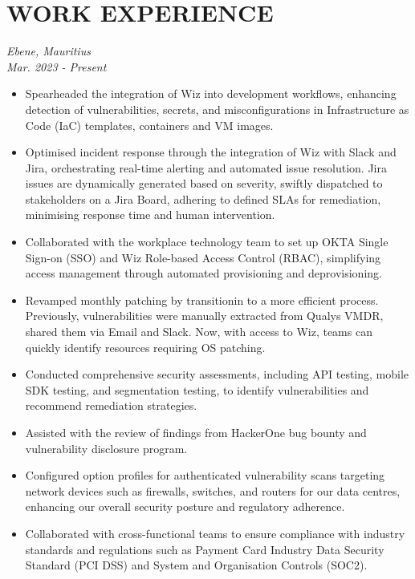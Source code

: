 \documentclass[a4paper, fleqn, oneside]{article}
\begin{document}
\section{WORK EXPERIENCE}
\label{sec:org4ad920f}
{ \hfill \textit{Ebene, Mauritius}} \\
{ \hfill {\textit{Mar. 2023 - Present}}}
\begin{itemize}
\item Spearheaded the integration of Wiz into development workflows, enhancing detection of vulnerabilities, secrets, and misconfigurations in Infrastructure as Code (IaC) templates, containers and VM images.
\item Optimised incident response through the integration of Wiz with Slack and Jira, orchestrating real-time alerting and automated issue resolution. Jira issues are dynamically generated based on severity, swiftly dispatched to stakeholders on a Jira Board, adhering to defined SLAs for remediation, minimising response time and human intervention.
\item Collaborated with the workplace technology team to set up OKTA Single Sign-on (SSO) and Wiz Role-based Access Control (RBAC), simplifying access management through automated provisioning and deprovisioning.
\item Revamped monthly patching by transitionin to a more efficient process. Previously, vulnerabilities were manually extracted from Qualys VMDR, shared them via Email and Slack. Now, with access to Wiz, teams can quickly identify resources requiring OS patching.
\item Conducted comprehensive security assessments, including API testing, mobile SDK testing, and segmentation testing, to identify vulnerabilities and recommend remediation strategies.
\item Assisted with the review of findings from HackerOne bug bounty and vulnerability disclosure program.
\item Configured option profiles for authenticated vulnerability scans targeting network devices such as firewalls, switches, and routers for our data centres, enhancing our overall security posture and regulatory adherence.
\item Collaborated with cross-functional teams to ensure compliance with industry standards and regulations such as Payment Card Industry Data Security Standard (PCI DSS) and System and Organisation Controls (SOC2).
\end{itemize}
\end{document}
